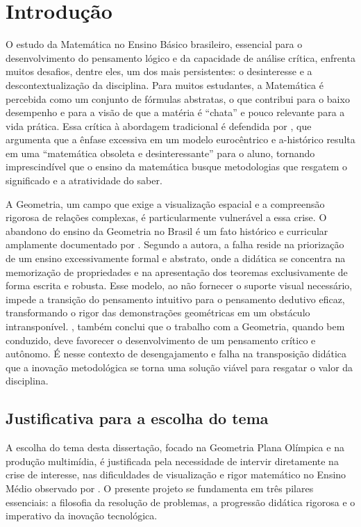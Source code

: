 \chapter{Introdução}\label{cap:introducao}
O estudo da Matemática no Ensino Básico brasileiro, essencial para o desenvolvimento do pensamento lógico e da capacidade de análise crítica, enfrenta muitos desafios, dentre eles, um dos mais persistentes: o desinteresse e a descontextualização da disciplina. Para muitos estudantes, a Matemática é percebida como um conjunto de fórmulas abstratas, o que contribui para o baixo desempenho e para a visão de que a matéria é ``chata'' e pouco relevante para a vida prática. Essa crítica à abordagem tradicional é defendida por , que argumenta que a ênfase excessiva em um modelo eurocêntrico e a-histórico resulta em uma ``matemática obsoleta e desinteressante'' para o aluno, tornando imprescindível que o ensino da matemática busque metodologias que resgatem o significado e a atratividade do saber.

A Geometria, um campo que exige a visualização espacial e a compreensão rigorosa de relações complexas, é particularmente vulnerável a essa crise. O abandono do ensino da Geometria no Brasil é um fato histórico e curricular amplamente documentado por . Segundo a autora, a falha reside na priorização de um ensino excessivamente formal e abstrato, onde a didática se concentra na memorização de propriedades e na apresentação dos teoremas exclusivamente de forma escrita e robusta. Esse modelo, ao não fornecer o suporte visual necessário, impede a transição do pensamento intuitivo para o pensamento dedutivo eficaz, transformando o rigor das demonstrações geométricas em um obstáculo intransponível. , também conclui que o trabalho com a Geometria, quando bem conduzido, deve favorecer o desenvolvimento de um pensamento crítico e autônomo. É nesse contexto de desengajamento e falha na transposição didática que a inovação metodológica se torna uma solução viável para resgatar o valor da disciplina.


\section{Justificativa para a escolha do tema}

A escolha do tema desta dissertação, focado na Geometria Plana Olímpica e na produção multimídia, é justificada pela necessidade de intervir diretamente na crise de interesse, nas dificuldades de visualização e rigor matemático no Ensino Médio observado por . O presente projeto se fundamenta em três pilares essenciais: a filosofia da resolução de problemas, a progressão didática rigorosa e o imperativo da inovação tecnológica.

